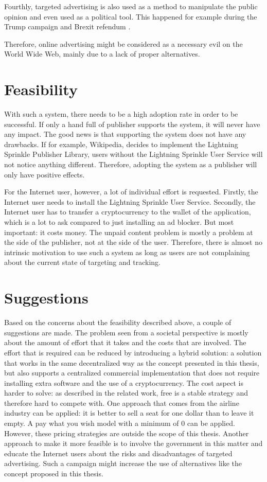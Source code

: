 Fourthly, targeted advertising is also used as a method to manipulate the public opinion and even used as a political tool. This happened for example during the Trump campaign and Brexit refendum \cite{cadwalladr2018cambridge}.

Therefore, online advertising might be considered as a necessary evil on the World Wide Web, mainly due to a lack of proper alternatives.

\section{Feasibility}
With such a system, there needs to be a high adoption rate in order to be successful. If only a hand full of publisher supports the system, it will never have any impact. The good news is that supporting the system does not have any drawbacks. If for example, Wikipedia, decides to implement the Lightning Sprinkle Publisher Library, users without the Lightning Sprinkle User Service will not notice anything different. Therefore, adopting the system as a publisher will only have positive effects.

For the Internet user, however, a lot of individual effort is requested. Firstly, the Internet user needs to install the Lightning Sprinkle User Service. Secondly, the Internet user has to transfer a cryptocurrency to the wallet of the application, which is a lot to ask compared to just installing an ad blocker. 
But most important: it costs money. The unpaid content problem is mostly a problem at the side of the publisher, not at the side of the user. Therefore, there is almost no intrinsic motivation to use such a system as long as users are not complaining about the current state of targeting and tracking. 

\section{Suggestions}
Based on the concerns about the feasibility described above, a couple of suggestions are made. The problem seen from a societal perspective is mostly about the amount of effort that it takes and the costs that are involved. The effort that is required can be reduced by introducing a hybrid solution: a solution that works in the same decentralized way as the concept presented in this thesis, but also supports a centralized commercial implementation that does not require installing extra software and the use of a cryptocurrency. The cost aspect is harder to solve: as described in the related work, free is a stable strategy and therefore hard to compete with. One approach that comes from the airline industry can be applied: it is better to sell a seat for one dollar than to leave it empty. A pay what you wish model with a minimum of 0 can be applied. However, these pricing strategies are outside the scope of this thesis. Another approach to make it more feasible is to involve the government in this matter and educate the Internet users about the risks and disadvantages of targeted advertising. Such a campaign might increase the use of alternatives like the concept proposed in this thesis.


